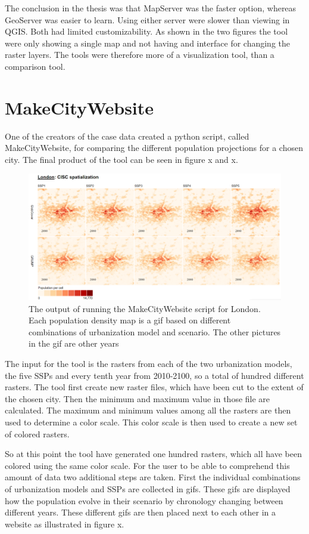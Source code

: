 The conclusion in the thesis was that MapServer was the faster option, whereas GeoServer was easier to learn. Using either server were slower than viewing in QGIS. Both had limited customizability. As shown in the two figures the tool were only showing a single map and not having and interface for changing the raster layers. The tools were therefore more of a visualization tool, than a comparison tool.



\section{MakeCityWebsite}
One of the creators of the case data created a python script, called MakeCityWebsite, for comparing the different population projections for a chosen city.  The final product of the tool can be seen in figure x and x. 

\begin{figure} [H]
	\centering
	\includegraphics[width=1\textwidth]{Pictures/MakeCityWebsite1}
	\caption{The output of running the MakeCityWebsite script for London. Each population density map is a gif based on different combinations of urbanization model and scenario. The other pictures in the gif are other years}
	\label{MakeCityWebsite1}
\end{figure}
The input for the tool is the rasters from each of the two urbanization models, the five SSPs and every tenth year from 2010-2100, so a total of hundred different rasters.
The tool first create new raster files, which have been cut to the extent of the chosen city. Then the minimum and maximum value in those file are calculated. The maximum and minimum values among all the rasters are then used to determine a color scale. This color scale is then used to create a new set of colored rasters.

So at this point the tool have generated one hundred rasters, which all have been colored using the same color scale. For the user to be able to comprehend this amount of data two additional steps are taken. First the individual combinations of urbanization models and SSPs are collected in gifs. These gifs are displayed how the population evolve in their scenario by chronology changing between different years. These different gifs are then placed next to each other in a website as illustrated in figure x. 

